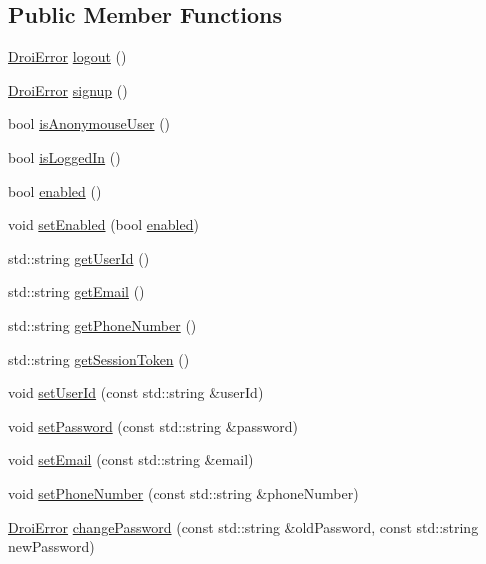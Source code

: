 \subsection*{Public Member Functions}
\begin{DoxyCompactItemize}
\item 
\hyperlink{class_droi_error}{Droi\+Error} \hyperlink{class_droi_user_a14a693a064e644ecda56e61f107315c9}{logout} ()
\item 
\hyperlink{class_droi_error}{Droi\+Error} \hyperlink{class_droi_user_ae26c7f0f576a663d3ce3c5bfc03a102b}{signup} ()
\item 
bool \hyperlink{class_droi_user_a3997fd724988f04f0ec7c346340e2ac5}{is\+Anonymouse\+User} ()
\item 
bool \hyperlink{class_droi_user_a28a2d6c0c0f07833da4584beb47ab01f}{is\+Logged\+In} ()
\item 
bool \hyperlink{class_droi_user_ae2f95d9b44530fe46358b8ac584d844f}{enabled} ()
\item 
void \hyperlink{class_droi_user_ad4142478f0499ff7eefbba8a7654efce}{set\+Enabled} (bool \hyperlink{class_droi_user_ae2f95d9b44530fe46358b8ac584d844f}{enabled})
\item 
std\+::string \hyperlink{class_droi_user_a95d13af36734958546e656b6f1f19ddd}{get\+User\+Id} ()
\item 
std\+::string \hyperlink{class_droi_user_a13d2714ae33f6064da1448736e78ea02}{get\+Email} ()
\item 
std\+::string \hyperlink{class_droi_user_a346b687624c9b1df80de63e39799e5d1}{get\+Phone\+Number} ()
\item 
std\+::string \hyperlink{class_droi_user_a08f406ceef3b33e5a8f8e37c60cdfde3}{get\+Session\+Token} ()
\item 
void \hyperlink{class_droi_user_a84f5d57a02e5c7c77ea534787653bbb9}{set\+User\+Id} (const std\+::string \&user\+Id)
\item 
void \hyperlink{class_droi_user_afdc2427b453225d6bc014a5a2bb69086}{set\+Password} (const std\+::string \&password)
\item 
void \hyperlink{class_droi_user_a20e7019a45e75a54fb117feacb000f33}{set\+Email} (const std\+::string \&email)
\item 
void \hyperlink{class_droi_user_a3b208995b25dc47e72d1fa25b5a0845c}{set\+Phone\+Number} (const std\+::string \&phone\+Number)
\item 
\hyperlink{class_droi_error}{Droi\+Error} \hyperlink{class_droi_user_a3bea249ce5f0c182784979297e36c492}{change\+Password} (const std\+::string \&old\+Password, const std\+::string new\+Password)

\end{DoxyCompactItemize}
